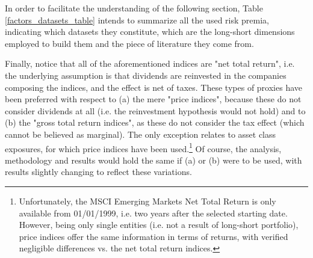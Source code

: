 \documentclass[12pt]{article}
\begin{document}
In order to facilitate the understanding of the following section, Table \ref{factors_datasets_table} intends to summarize all the used risk premia, indicating which datasets they constitute, which are the long-short dimensions employed to build them and the piece of literature they come from.

Finally, notice that all of the aforementioned indices are "net total return", i.e. the underlying assumption is that dividends are reinvested in the companies composing the indices, and the effect is net of taxes. These types of proxies have been preferred with respect to (a) the mere "price indices", because these do not consider dividends at all (i.e. the reinvestment hypothesis would not hold) and to (b) the "gross total return indices", as these do not consider the tax effect (which cannot be believed as marginal). The only exception relates to asset class exposures, for which price indices have been used.\footnote{Unfortunately, the MSCI Emerging Markets Net Total Return is only available from 01/01/1999, i.e. two years after the selected starting date. However, being only single entities (i.e. not a result of long-short portfolio), price indices offer the same information in terms of returns, with verified negligible differences vs. the net total return indices.} Of course, the analysis, methodology and results would hold the same if (a) or (b) were to be used, with results slightly changing to reflect these variations. \\
\end{document}
